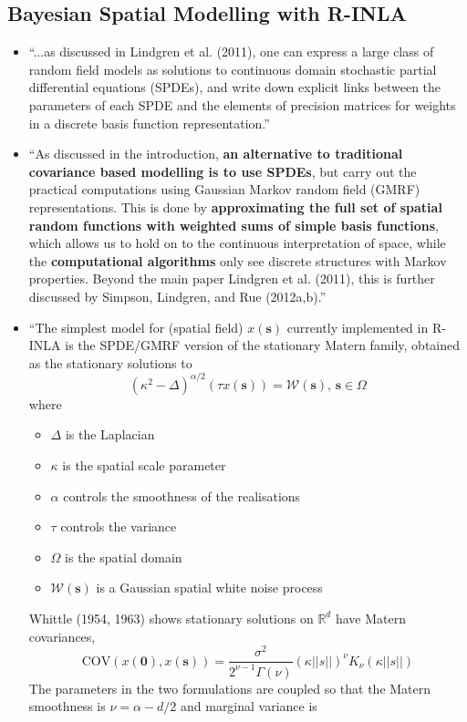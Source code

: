 \documentclass{article}
\begin{document}
\subsection*{Bayesian Spatial Modelling with R-INLA \citep{Lindgren2015}}
\begin{itemize}
\item ``...as discussed in Lindgren et al. (2011), one can express a large class of random field models as solutions to continuous domain stochastic partial differential equations (SPDEs), and write down explicit links between the parameters of each SPDE and the elements of precision matrices for weights in a discrete basis function representation.''
\item ``As discussed in the introduction, {\bf an alternative to traditional covariance based modelling is to use SPDEs}, but carry out the practical computations using Gaussian Markov random field (GMRF) representations. This is done by {\bf approximating the full set of spatial random functions with weighted sums of simple basis functions}, which allows us to hold on to the continuous interpretation of space, while the {\bf computational algorithms} only see discrete structures with Markov properties. Beyond the main paper Lindgren et al. (2011), this is further discussed by Simpson, Lindgren, and Rue (2012a,b).''
\item ``The simplest model for (spatial field) $x(\pmb{s})$ currently implemented in R-INLA is the SPDE/GMRF version of the stationary Matern family, obtained as the stationary solutions to
$$ (\kappa^{2} - \Delta)^{\alpha/2}(\tau x(\pmb{s})) = \mathcal{W}(\pmb{s})\text{, } \pmb{s} \in \Omega $$ where
    \begin{itemize}
    \item $\Delta$ is the Laplacian
    \item $\kappa$ is the spatial scale parameter
    \item $\alpha$ controls the smoothness of the realisations
    \item $\tau$ controls the variance
    \item $\Omega$ is the spatial domain
    \item $\mathcal{W}(\pmb{s})$ is a Gaussian spatial white noise process
    \end{itemize}
Whittle (1954, 1963) shows stationary solutions on $\mathbb{R}^{d}$ have Matern covariances,
$$\text{COV}(x(\pmb{0}), x(\pmb{s})) = \frac{\sigma^{2}}{2^{\nu - 1}\Gamma(\nu)}(\kappa||s||)^{\nu}K_{\nu}(\kappa||s||)$$
The parameters in the two formulations are coupled so that the Matern smoothness is $\nu = \alpha - d/2$ and marginal variance is

\end{itemize}
\end{document}
